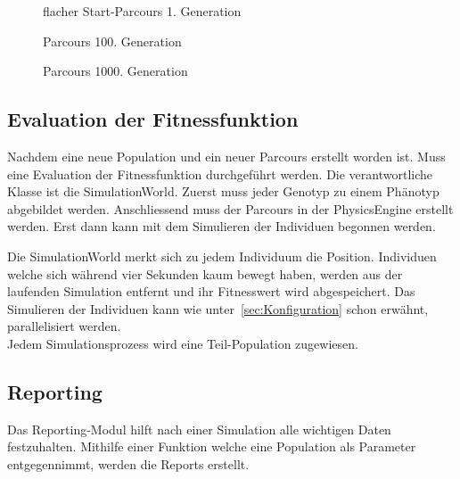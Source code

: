       \begin{figure}[H]
        \centering
        
        \caption{flacher Start-Parcours 1. Generation\label{fig:parcours1}}
      \end{figure}

      \begin{figure}[H]
        \centering
        
        \caption{Parcours 100. Generation\label{fig:parcours2}}
      \end{figure}

      \begin{figure}[H]
        \centering
        
        \caption{Parcours 1000. Generation\label{fig:parcours3}}
      \end{figure}

      \subsection{Evaluation der Fitnessfunktion\label{sec:simulation}}

        Nachdem eine neue Population und ein neuer Parcours erstellt worden ist.
        Muss eine Evaluation der Fitnessfunktion durchgeführt werden.
        Die verantwortliche Klasse ist die SimulationWorld.
        Zuerst muss jeder Genotyp zu einem Phänotyp abgebildet werden.
        Anschliessend muss der Parcours in der \gls{PhysicsEngine} erstellt werden.
        Erst dann kann mit dem Simulieren der Individuen begonnen werden.

        \medskip

        Die SimulationWorld merkt sich zu jedem Individuum die Position.
        Individuen welche sich während vier Sekunden kaum bewegt haben,
        werden aus der laufenden Simulation entfernt und ihr Fitnesswert wird abgespeichert.
        Das Simulieren der Individuen kann wie unter~\vref{sec:Konfiguration} schon erwähnt, parallelisiert werden.
        \\
        Jedem Simulationsprozess wird eine Teil-Population zugewiesen.

    \subsection{Reporting\label{subsec:Reporting}}

      Das Reporting-Modul hilft nach einer Simulation alle wichtigen Daten festzuhalten.
      Mithilfe einer Funktion welche eine Population als Parameter entgegennimmt,
      werden die Reports erstellt.

